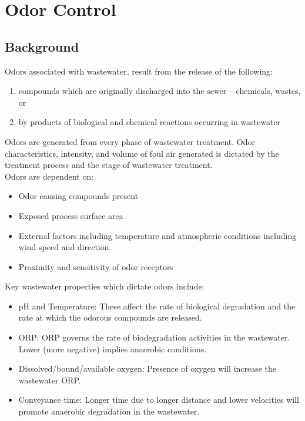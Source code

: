 \chapter{Odor Control}

\section{Background}

Odors associated with wastewater, result from the release of the following:
\begin{enumerate}
\item compounds which are originally discharged into the sewer – chemicals, wastes, or 
\item by products of biological and chemical reactions occurring in wastewater
\end{enumerate}
Odors are generated from every phase of wastewater treatment.
Odor characteristics, intensity, and volume of foul air generated is dictated by the treatment process and the stage of wastewater treatment.\\
Odors are dependent on:
\begin{itemize}
\item Odor causing compounds present
\item Exposed process surface area
\item External factors including temperature and atmospheric conditions including wind speed and direction.
\item Proximity and sensitivity of odor receptors
\end{itemize}

Key wastewater properties which dictate odors include:
\begin{itemize}
\item pH and Temperature: These affect the rate of biological degradation and the rate at which the odorous compounds are released.
\item ORP: ORP governs the rate of biodegradation activities in the wastewater. Lower (more negative) implies anaerobic conditions.
\item Dissolved/bound/available oxygen: Presence of oxygen will increase the wastewater ORP.
\item Conveyance time: Longer time due to longer distance and lower velocities will promote anaerobic degradation in the wastewater.
\end{itemize}

